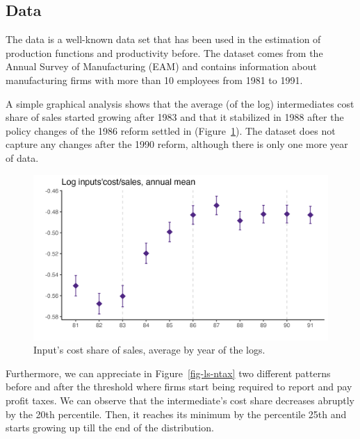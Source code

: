 \documentclass[
  12pt]{article}
\theoremstyle{definition}
\theoremstyle{remark}
\begin{document}
\hypertarget{data}{%
\subsection{Data}\label{data}}

The data is a well-known data set that has been used in the estimation
of production functions and productivity before. The dataset comes from
the Annual Survey of Manufacturing (EAM) and contains information about
manufacturing firms with more than 10 employees from 1981 to 1991.

A simple graphical analysis shows that the average (of the log)
intermediates cost share of sales started growing after 1983 and that it
stabilized in 1988 after the policy changes of the 1986 reform settled
in (Figure~\ref{fig-logshare}). The dataset does not capture any changes
after the 1990 reform, although there is only one more year of data.

\begin{figure}

{\centering \includegraphics[width=1\textwidth,height=\textheight]{../Results/Figures/Colombia/log_share_byy.png}

}

\caption{\label{fig-logshare}Input's cost share of sales, average by
year of the logs.}

\end{figure}

Furthermore, we can appreciate in Figure~\ref{fig-ls-ntax} two different
patterns before and after the threshold where firms start being required
to report and pay profit taxes. We can observe that the intermediate's
cost share decreases abruptly by the 20th percentile. Then, it reaches
its minimum by the percentile 25th and starts growing up till the end of
the distribution.
\end{document}
